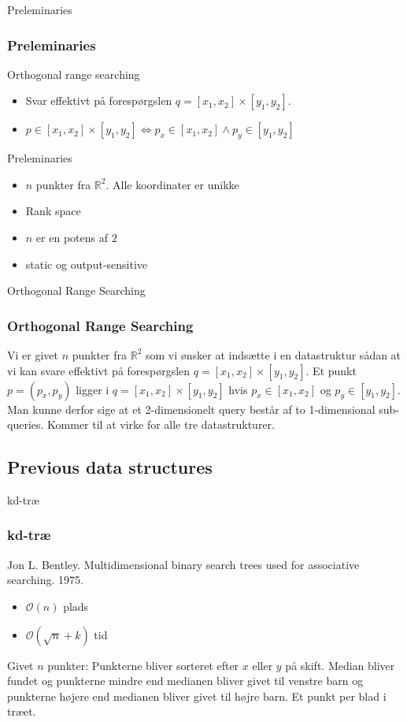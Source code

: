 \documentclass[pdf]{beamer}
\begin{document}
\begin{frame}{Preleminaries}
  \frametitle{Preleminaries}
  Orthogonal range searching
  \begin{itemize}
    \item Svar effektivt på forespørgslen $q = [x_1, x_2] \times [y_1, y_2]$.
    \item $p \in [x_1, x_2] \times [y_1, y_2] \Leftrightarrow p_x \in [x_1, x_2] \wedge p_y \in [y_1, y_2]$
  \end{itemize}

  Preleminaries
  \begin{itemize}

    \item $n$ punkter fra $\mathbb{R}^2$. Alle koordinater er unikke
    \item Rank space
    \item $n$ er en potens af $2$
    \item static og output-sensitive
  \end{itemize}
\end{frame}

\begin{frame}{Orthogonal Range Searching}
  \frametitle{Orthogonal Range Searching}

  Vi er givet $n$ punkter fra $\mathbb{R}^2$ som vi ønsker at indsætte i en datastruktur sådan at vi kan svare effektivt på forespørgslen $q = [x_1, x_2] \times [y_1, y_2]$.
  Et punkt $p = (p_x, p_y)$ ligger i $q = [x_1, x_2] \times [y_1, y_2]$ hvis $p_x \in [x_1, x_2]$ og $p_y \in [y_1, y_2]$. Man kunne derfor sige at et 2-dimensionelt query består af to 1-dimensional sub-queries. Kommer til at virke for alle tre datastrukturer.
\end{frame}

\subsection{Previous data structures}

\begin{frame}{kd-træ}
  \frametitle{kd-træ}
  Jon L. Bentley. Multidimensional binary search trees used for associative searching. 1975.
  \begin{itemize}
    \item $\mathcal{O}(n)$ plads
    \item $\mathcal{O}(\sqrt{n} + k)$ tid
  \end{itemize}

  Givet $n$ punkter: Punkterne bliver sorteret efter $x$ eller $y$ på skift. Median bliver fundet og punkterne mindre end medianen bliver givet til venstre barn og punkterne højere end medianen bliver givet til højre barn. Et punkt per blad i træet.
\end{frame}
\end{document}
